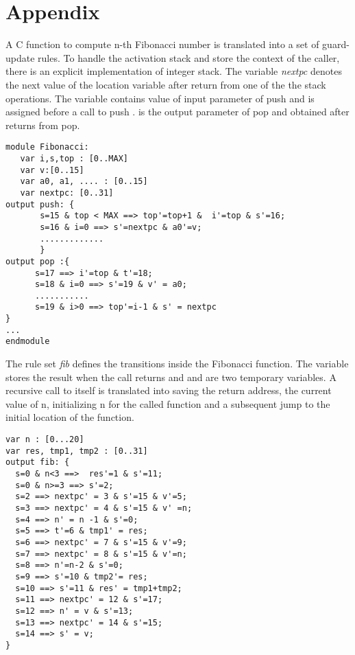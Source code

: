 \documentclass{llncs}
\begin{document}
 
 
\section*{Appendix}
A C function to compute n-th Fibonacci number is translated into  a set of guard-update rules.
To handle the activation stack and store the context of the caller, there is an explicit implementation
of integer stack. The variable {\em nextpc} denotes the next value of the location variable
after return from one of the the stack operations.
The variable  contains value of input parameter of push and  is assigned before a call to push
.  is the output parameter of pop and obtained after returns from pop.
{\small
\begin{verbatim}
module Fibonacci:
   var i,s,top : [0..MAX]
   var v:[0..15]
   var a0, a1, .... : [0..15]
   var nextpc: [0..31] 
output push: {   
       s=15 & top < MAX ==> top'=top+1 &  i'=top & s'=16; 
       s=16 & i=0 ==> s'=nextpc & a0'=v;
       .............  
       }
output pop :{
      s=17 ==> i'=top & t'=18;
      s=18 & i=0 ==> s'=19 & v' = a0;
      ...........
      s=19 & i>0 ==> top'=i-1 & s' = nextpc
}
...
endmodule
\end{verbatim}
}
\noindent
The rule set {\em fib} defines the transitions inside the Fibonacci function. 
The variable  stores the result when the call returns and  and  are two 
temporary variables.  
A recursive call to itself is translated into saving the return address,  the current value of n,
initializing n for the called function and a subsequent jump to the initial location of the function. 
{\footnotesize
\begin{verbatim}
var n : [0...20]      
var res, tmp1, tmp2 : [0..31]                       
output fib: {                                                 
  s=0 & n<3 ==>  res'=1 & s'=11;             
  s=0 & n>=3 ==> s'=2;                               
  s=2 ==> nextpc' = 3 & s'=15 & v'=5;          
  s=3 ==> nextpc' = 4 & s'=15 & v' =n;       
  s=4 ==> n' = n -1 & s'=0;                           
  s=5 ==> t'=6 & tmp1' = res;                      
  s=6 ==> nextpc' = 7 & s'=15 & v'=9;          
  s=7 ==> nextpc' = 8 & s'=15 & v'=n;        
  s=8 ==> n'=n-2 & s'=0;                                
  s=9 ==> s'=10 & tmp2'= res;                    
  s=10 ==> s'=11 & res' = tmp1+tmp2;         
  s=11 ==> nextpc' = 12 & s'=17;                    
  s=12 ==> n' = v & s'=13;                           
  s=13 ==> nextpc' = 14 & s'=15;               
  s=14 ==> s' = v;                                           
}                                                                         
\end{verbatim}
}
\end{document}
